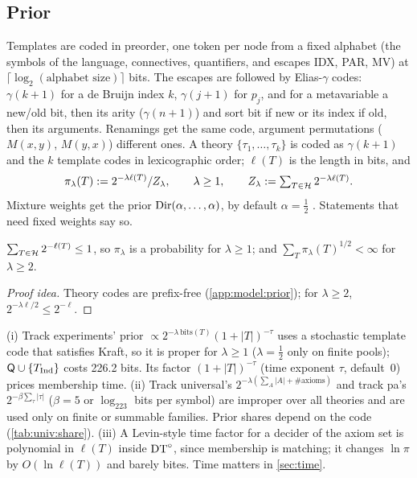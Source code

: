 \subsection{Prior}\label{sec:model:prior}

\begin{definition}\label{def:model:prior}
Templates are coded in preorder, one token per node from a fixed alphabet (the symbols of the language, connectives, quantifiers, and escapes IDX, PAR, MV) at $\lceil\log_2(\text{alphabet size})\rceil$ bits. The escapes are followed by Elias-$\gamma$ codes: $\gamma(k+1)$ for a de Bruijn index $k$, $\gamma(j+1)$ for $p_j$, and for a metavariable a new/old bit, then its arity ($\gamma(n+1)$) and sort bit if new or its index if old, then its arguments. Renamings get the same code, argument permutations ($M(x,y)$, $M(y,x)$) different ones. A theory $\{\tau_1,\dots,\tau_k\}$ is coded as $\gamma(k+1)$ and the $k$ template codes in lexicographic order; $\ell(T)$ is the length in bits, and
\[
\pi_\lambda(T):=2^{-\lambda\ell(T)}/Z_\lambda,\qquad \lambda\ge1,\qquad Z_\lambda:=\textstyle\sum_{T\in\mathcal{H}}2^{-\lambda\ell(T)}.
\]
Mixture weights get the prior $\mathrm{Dir}(\alpha,\dots,\alpha)$, by default $\alpha=\tfrac12$ \citep{krichevsky1981performance}. Statements that need fixed weights say so.
\end{definition}

\begin{lemma}[Kraft]\label{lem:model:kraft}
$\sum_{T\in\mathcal{H}}2^{-\ell(T)}\le1$, so $\pi_\lambda$ is a probability for $\lambda\ge1$; and $\sum_T\pi_\lambda(T)^{1/2}<\infty$ for $\lambda\ge2$.
\end{lemma}

\begin{proof}[Proof idea]
Theory codes are prefix-free (\cref{app:model:prior}); for $\lambda\ge2$, $2^{-\lambda\ell/2}\le2^{-\ell}$.
\end{proof}

\begin{remark}\label{rem:model:priors}
(i) Track experiments' prior $\propto2^{-\lambda\,\mathrm{bits}(T)}(1+|T|)^{-\tau}$ uses a stochastic template code that satisfies Kraft, so it is proper for $\lambda\ge1$ ($\lambda=\tfrac12$ only on finite pools); $\mathsf{Q}\cup\{T_{\mathrm{Ind}}\}$ costs 226.2 bits. Its factor $(1+|T|)^{-\tau}$ (time exponent $\tau$, default~0) prices membership time.
(ii) Track universal's $2^{-\lambda(\sum_A|A|+\#\text{axioms})}$ and track pa's $2^{-\beta\sum_\tau|\tau|}$ ($\beta=5$ or $\log_223$ bits per symbol) are improper over all theories and are used only on finite or summable families. Prior shares depend on the code (\cref{tab:univ:share}).
(iii) A Levin-style time factor for a decider of the axiom set is polynomial in $\ell(T)$ inside $\mathrm{DT}^{\circ}$, since membership is matching; it changes $\ln\pi$ by $O(\ln\ell(T))$ and barely bites. Time matters in \cref{sec:time}.
\end{remark}

